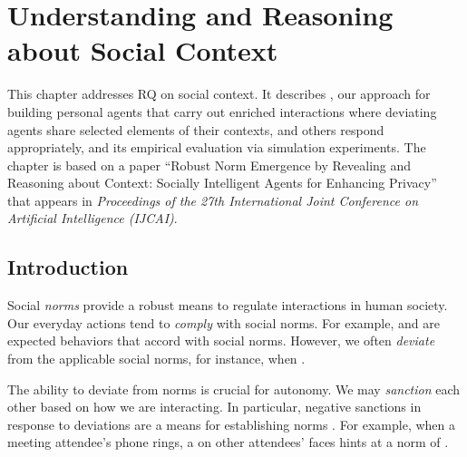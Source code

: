 \chapter[Understanding Social Context]{Understanding and Reasoning about Social Context}
\label{chap:poros}

This chapter addresses RQ on social context. It describes \frameworkB, our approach for building
personal agents that carry out enriched interactions where deviating
agents share selected elements of their contexts, and others
respond appropriately, and its empirical evaluation via 
simulation experiments. The chapter is based on a paper ``Robust Norm 
Emergence by Revealing and Reasoning about Context: Socially 
Intelligent Agents for Enhancing Privacy'' that appears in 
\emph{ Proceedings of the 27th International Joint Conference 
on Artificial Intelligence (IJCAI)}.

\section{Introduction}
\label{sec:Poros-intro}

Social \emph{norms} provide a robust means to regulate interactions in 
human society. Our everyday actions tend to \emph{comply} with social norms. For example,  and  are expected 
behaviors that accord with social norms. However,  we often \emph{deviate} from the applicable social norms, for 
instance, when .

The ability to deviate from norms is crucial for autonomy. We 
may \emph{sanction} each other based on how we
are interacting. In particular, negative sanctions in response to
deviations are a means for establishing norms \citep{Andrighetto-2013-PunishVoice}. 
For example, when a meeting attendee's phone rings, a  on other attendees'
faces hints at a norm of .


